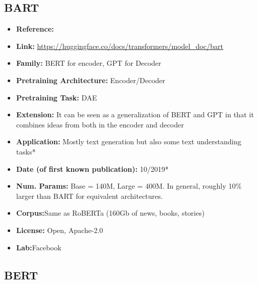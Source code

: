 \documentclass{article}
\begin{document}
\subsection{BART}
            \begin{itemize}
                \item \textbf{Reference:} 
                \item \textbf{Link:} \url{https://huggingface.co/docs/transformers/model_doc/bart}
                \item \textbf{Family:} BERT for encoder, GPT for Decoder 
                \item \textbf{Pretraining Architecture:} Encoder/Decoder
                \item \textbf{Pretraining Task:} DAE
                \item \textbf{Extension:} It can be seen as a generalization of BERT and GPT in that it combines ideas from both in the encoder and decoder   
                \item \textbf{Application:} Mostly text generation but also some text understanding tasks*
                \item \textbf{Date (of first known publication):} 10/2019*
                \item \textbf{Num. Params:} Base = 140M, Large = 400M. In general, roughly 10\% larger than BART for equivalent architectures.
                \item \textbf{Corpus:}Same as RoBERTa (160Gb of news, books, stories)
                \item \textbf{License:} Open, Apache-2.0
                \item \textbf{Lab:}Facebook
            \end{itemize}
            
\subsection{BERT}
\end{document}
